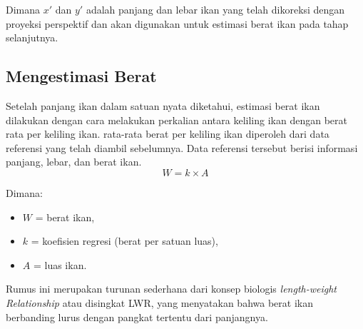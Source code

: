     Dimana \(x'\) dan \(y'\) adalah panjang dan lebar ikan yang telah dikoreksi dengan proyeksi perspektif dan akan digunakan untuk estimasi berat ikan pada tahap selanjutnya. 

\subsection{Mengestimasi Berat}
Setelah panjang ikan dalam satuan nyata diketahui, estimasi berat ikan dilakukan dengan cara melakukan perkalian antara keliling ikan dengan berat rata per keliling ikan.
rata-rata berat per keliling ikan diperoleh dari data referensi yang telah diambil sebelumnya. Data referensi tersebut berisi informasi panjang, lebar, dan berat ikan. 
\begin{equation}
    W = k \times A
\end{equation}

Dimana:
\begin{itemize}
    \item $W$ = berat ikan,
    \item $k$ = koefisien regresi (berat per satuan luas),
    \item $A$ = luas ikan.
\end{itemize}

Rumus ini merupakan turunan sederhana dari konsep biologis \emph{length-weight Relationship} atau disingkat LWR, yang menyatakan bahwa berat ikan berbanding lurus dengan pangkat tertentu dari panjangnya. 


